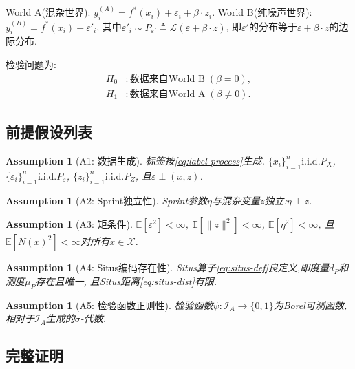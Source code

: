 \documentclass[12pt,a4paper]{article}
\newtheorem{assumption}[theorem]{Assumption}
\newcommand{\E}{\mathbb{E}}
\newcommand{\cX}{\mathcal{X}}
\newcommand{\cI}{\mathcal{I}}
\newcommand{\Law}{\mathcal{L}}
\newcommand{\defeq}{\triangleq}
\newcommand{\iid}{\mathrm{i.i.d.}}
\begin{document}
World A(混杂世界): $y_i^{(A)} = f^*(x_i) + \varepsilon_i + \beta\cdot z_i$.
World B(纯噪声世界): $y_i^{(B)} = f^*(x_i) + \varepsilon'_i$,
其中$\varepsilon'_i \sim P_{\varepsilon'} \defeq \Law(\varepsilon + \beta\cdot z)$,
即$\varepsilon'$的分布等于$\varepsilon + \beta\cdot z$的边际分布.

检验问题为:
\begin{align*}
    H_0 &: \text{数据来自World B}\;(\beta = 0),\\
    H_1 &: \text{数据来自World A}\;(\beta \neq 0).
\end{align*}

\subsection{前提假设列表}

\begin{assumption}[A1: 数据生成]\label{ass:A1}
    标签按\eqref{eq:label-process}生成.
    $\{x_i\}_{i=1}^n \iid P_X$,
    $\{\varepsilon_i\}_{i=1}^n \iid P_\varepsilon$,
    $\{z_i\}_{i=1}^n \iid P_Z$,
    且$\varepsilon \perp (x,z)$.
\end{assumption}

\begin{assumption}[A2: Sprint独立性]\label{ass:A2}
    Sprint参数$\eta$与混杂变量$z$独立:$\eta \perp z$.
\end{assumption}

\begin{assumption}[A3: 矩条件]\label{ass:A3}
    $\E[\varepsilon^2] < \infty$,
    $\E[\|z\|^2] < \infty$,
    $\E[\eta^2] < \infty$,
    且$\E[N(x)^2] < \infty$对所有$x \in \cX$.
\end{assumption}

\begin{assumption}[A4: Situs编码存在性]\label{ass:A4}
    Situs算子\eqref{eq:situs-def}良定义,即度量$d_P$和测度$\mu_P$存在且唯一,
    且Situs距离\eqref{eq:situs-dist}有限.
\end{assumption}

\begin{assumption}[A5: 检验函数正则性]\label{ass:A5}
    检验函数$\psi: \cI_A \to \{0,1\}$为Borel可测函数,
    相对于$\cI_A$生成的$\sigma$-代数.
\end{assumption}

\subsection{完整证明}
\end{document}

